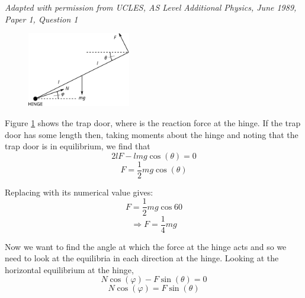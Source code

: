 
\begin{problem}[AS1989AddPQ1p] %
{
}
{\textit{Adapted with permission from UCLES, AS Level Additional Physics, June 1989, Paper 1, Question 1}}
{
\begin{figure}
	\centering
	\includegraphics[width=0.4\textwidth]{../../../figures/Statics_trapdoor_hinge.svg}
	\caption{}
	\label{fig:Statics_trapdoor_hinge}
\end{figure}
Figure \ref{fig:Statics_trapdoor_hinge} shows the trap door, where  is the reaction force at the hinge. If the trap door has some length  then, taking moments about the hinge and noting that the trap door is in equilibrium, we find that
\begin{equation*}
2lF-lmg\cos(\theta)=0	
\end{equation*}
\begin{equation*}
F=\frac{1}{2}mg\cos(\theta)	
\end{equation*}

Replacing \vari{\theta} with its numerical value gives:
\begin{equation*}
F = \frac{1}{2}mg\cos{60}	
\end{equation*}
\begin{equation*}	
\Rightarrow F = \frac{1}{4}mg 	
\end{equation*}
	
Now we want to find the angle at which the force at the hinge acts and so we need to look at the equilibria in each direction at the hinge. Looking at the horizontal equilibrium at the hinge,
\begin{equation*}
N\cos(\varphi)-F\sin(\theta)=0	
\end{equation*}	
\begin{equation}
N\cos(\varphi)=F\sin(\theta)	 \label{eq:Statics_trapdoor_1}
\end{equation}	

}
\end{problem}
